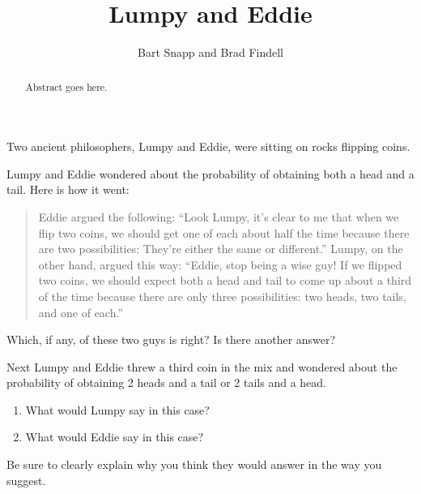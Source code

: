 \documentclass{ximera}
\title{Lumpy and Eddie}
\author{Bart Snapp and Brad Findell}
\begin{document}
\begin{abstract}
Abstract goes here.  
\end{abstract}
\maketitle

Two ancient philosophers, Lumpy and Eddie, were sitting on rocks
flipping coins. 

\begin{problem} Lumpy and Eddie wondered about the probability of obtaining both a head and a tail. Here is how it went:
\begin{quote}
Eddie argued the following: ``Look Lumpy, it's clear to me that when
we flip two coins, we should get one of each about half the time
because there are two possibilities: They're either the same or
different.'' Lumpy, on the other hand, argued this way: ``Eddie, stop
being a wise guy! If we flipped two coins, we should expect both a
head and tail to come up about a third of the time because there are
only three possibilities: two heads, two tails, and one of each.''
\end{quote}
Which, if any, of these two guys is right?  Is there another answer?
\end{problem}

\begin{problem}
Next Lumpy and Eddie threw a third coin in the mix and wondered about
the probability of obtaining 2 heads and a tail or 2 tails and a head.
\begin{enumerate}
\item What would Lumpy say in this case?
\item What would Eddie say in this case?
\end{enumerate}
Be sure to clearly explain why you think they would answer in the way
you suggest.
\end{problem}
\end{document}
